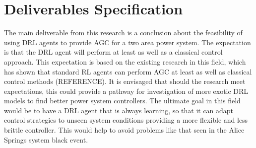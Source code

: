 \section{Deliverables Specification}
The main deliverable from this research is a conclusion about the feasibility of using DRL agents to provide AGC for a two area power system. The expectation is that the DRL agent will perform at least as well as a classical control approach. This expectation is based on the existing research in this field, which has shown that standard RL agents can perform AGC at least as well as classical control methods (REFERENCE). It is envisaged that should the research meet expectations, this could provide a pathway for investigation of more exotic DRL models to find better power system controllers. The ultimate goal in this field would be to have a DRL agent that is always learning, so that it can adapt control strategies to unseen system conditions providing a more flexible and less brittle controller. This would help to avoid problems like that seen in the Alice Springs system black event.\\